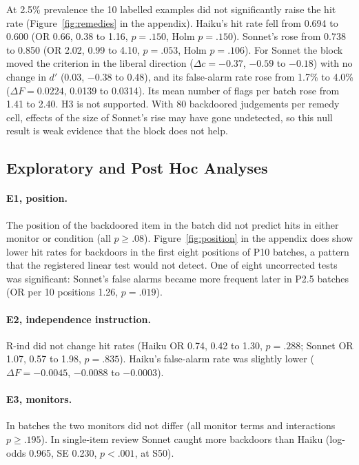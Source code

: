 \documentclass[letterpaper]{article} %
\begin{document}
At 2.5\% prevalence the 10 labelled examples did not significantly raise the hit rate (Figure~\ref{fig:remedies} in the appendix). Haiku's hit rate fell from 0.694 to 0.600 (OR 0.66, 0.38 to 1.16, $p = .150$, Holm $p = .150$). Sonnet's rose from 0.738 to 0.850 (OR 2.02, 0.99 to 4.10, $p = .053$, Holm $p = .106$). For Sonnet the block moved the criterion in the liberal direction ($\Delta c = {-0.37}$, $-0.59$ to $-0.18$) with no change in $d'$ (0.03, $-0.38$ to 0.48), and its false-alarm rate rose from 1.7\% to 4.0\% ($\Delta F = 0.0224$, 0.0139 to 0.0314). Its mean number of flags per batch rose from 1.41 to 2.40. H3 is not supported. With 80 backdoored judgements per remedy cell, effects of the size of Sonnet's rise may have gone undetected, so this null result is weak evidence that the block does not help.

\subsection{Exploratory and Post Hoc Analyses}

\paragraph{E1, position.} The position of the backdoored item in the batch did not predict hits in either monitor or condition (all $p \geq .08$). Figure~\ref{fig:position} in the appendix does show lower hit rates for backdoors in the first eight positions of P10 batches, a pattern that the registered linear test would not detect. One of eight uncorrected tests was significant: Sonnet's false alarms became more frequent later in P2.5 batches (OR per 10 positions 1.26, $p = .019$).

\paragraph{E2, independence instruction.} R-ind did not change hit rates (Haiku OR 0.74, 0.42 to 1.30, $p = .288$; Sonnet OR 1.07, 0.57 to 1.98, $p = .835$). Haiku's false-alarm rate was slightly lower ($\Delta F = {-0.0045}$, ${-0.0088}$ to ${-0.0003}$).

\paragraph{E3, monitors.} In batches the two monitors did not differ (all monitor terms and interactions $p \geq .195$). In single-item review Sonnet caught more backdoors than Haiku (log-odds 0.965, SE 0.230, $p < .001$, at S50).
\end{document}
